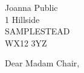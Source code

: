 \documentclass[version=last]{scrlttr2}
\begin{document}
\begin{letter}{%
    Joanna Public\\
    1 Hillside\\
    SAMPLESTEAD\\
    WX12 3YZ%
  }
\opening{Dear Madam Chair,}
\end{letter}
\end{document}
